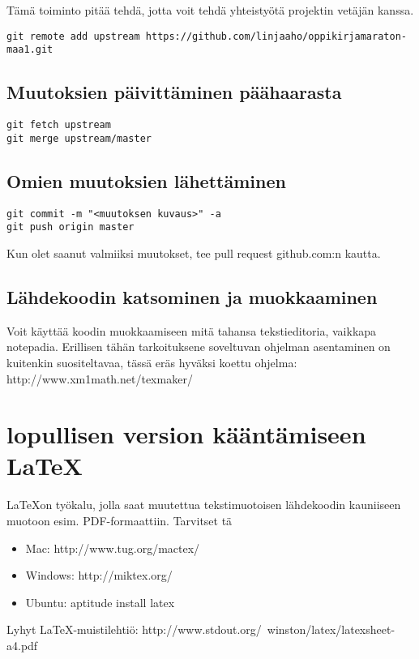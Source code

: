 Tämä toiminto pitää tehdä, jotta voit tehdä yhteistyötä projektin vetäjän kanssa.

\begin{verbatim}
git remote add upstream https://github.com/linjaaho/oppikirjamaraton-maa1.git
\end{verbatim}

\subsection{Muutoksien päivittäminen päähaarasta}

\begin{verbatim}
git fetch upstream
git merge upstream/master
\end{verbatim}

\subsection{Omien muutoksien lähettäminen}

\begin{verbatim}
git commit -m "<muutoksen kuvaus>" -a
git push origin master
\end{verbatim}

Kun olet saanut valmiiksi muutokset, tee pull request github.com:n kautta.

\subsection{Lähdekoodin katsominen ja muokkaaminen}

Voit käyttää koodin muokkaamiseen mitä tahansa tekstieditoria, vaikkapa notepadia. Erillisen tähän tarkoituksene soveltuvan ohjelman asentaminen on kuitenkin suositeltavaa, tässä eräs hyväksi koettu ohjelma: http://www.xm1math.net/texmaker/

\section{lopullisen version kääntämiseen \LaTeX}

\LaTeX on työkalu, jolla saat muutettua tekstimuotoisen lähdekoodin kauniiseen muotoon esim. PDF-formaattiin. Tarvitset tä

\begin{itemize}

\item Mac: http://www.tug.org/mactex/
\item Windows: http://miktex.org/
\item Ubuntu: aptitude install latex

\end{itemize}

Lyhyt \LaTeX -muistilehtiö: http://www.stdout.org/~winston/latex/latexsheet-a4.pdf


